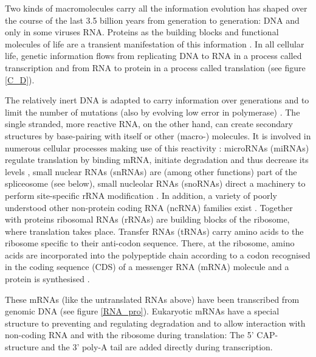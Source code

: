 Two kinds of macromolecules carry all the information evolution has
shaped over the course of the last 3.5 billion years from generation
to generation: DNA and only in some viruses RNA. Proteins as the
building blocks and functional molecules of life are a transient
manifestation of this information \cite{crick1958biological}. In all
cellular life, genetic information flows from replicating DNA to RNA
in a process called transcription and from RNA to protein in a process
called translation \cite{pmid5422595} (see figure \ref{C_D}).

The relatively inert DNA is adapted to carry information over
generations and to limit the number of mutations (also by evolving low
error in polymerase) \cite{pmid21821597}. The single stranded, more
reactive RNA, on the other hand, can create secondary structures by
base-pairing with itself or other (macro-) molecules. It is involved
in numerous cellular processes making use of this reactivity
\cite{pmid21850044}: microRNAs (miRNAs) regulate translation by
binding mRNA, initiate degradation and thus decrease its levels
\cite{pmid20703300,pmid11679654}, small nuclear RNAs (snRNAs) are
(among other functions) part of the spliceosome (see below), small
nucleolar RNAs (snoRNAs) direct a machinery to perform site-specific
rRNA modification \cite{pmid19446021}. In addition, a variety of
poorly understood other non-protein coding RNA (ncRNA) families exist
\cite{pmid16344563}. Together with proteins ribosomal RNAs (rRNAs) are
building blocks of the ribosome, where translation takes
place. Transfer RNAs (tRNAs) carry amino acids to the ribosome
specific to their anti-codon sequence. There, at the ribosome, amino
acids are incorporated into the polypeptide chain according to a codon
recognised in the coding sequence (CDS) of a messenger RNA (mRNA)
molecule and a protein is synthesised \cite{pmid4887876}.

These mRNAs (like the untranslated RNAs above) have been transcribed
from genomic DNA (see figure \ref{RNA_pro}). Eukaryotic mRNAs have a
special structure to preventing and regulating degradation and to
allow interaction with non-coding RNA and with the ribosome during
translation: The 5' CAP-structure and the 3' poly-A tail are added
directly during transcription.


